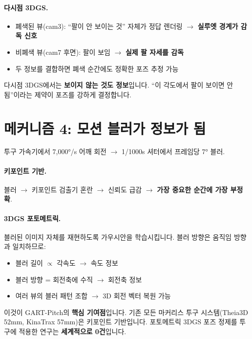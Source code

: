 \documentclass[11pt, a4paper]{report}
\begin{document}
\paragraph{다시점 3DGS.}
\begin{itemize}[leftmargin=*]
  \item 폐색된 뷰(cam3): ``팔이 안 보이는 것'' 자체가 정답 렌더링 $\to$ \textbf{실루엣 경계가 감독 신호}
  \item 비폐색 뷰(cam7 후면): 팔이 보임 $\to$ \textbf{실제 팔 자세를 감독}
  \item 두 정보를 결합하면 폐색 순간에도 정확한 포즈 추정 가능
\end{itemize}

\begin{keyidea}
다시점 3DGS에서는 \textbf{보이지 않는 것도 정보}입니다. ``이 각도에서 팔이 보이면 안 됨''이라는 제약이 포즈를 강하게 결정합니다.
\end{keyidea}


\section{메커니즘 4: 모션 블러가 정보가 됨}

투구 가속기에서 7,000°/s 어깨 회전 $\to$ 1/1000s 셔터에서 프레임당 7° 블러.

\paragraph{키포인트 기반.}
블러 $\to$ 키포인트 검출기 혼란 $\to$ 신뢰도 급감 $\to$ \textbf{가장 중요한 순간에 가장 부정확}.

\paragraph{3DGS 포토메트릭.}
블러된 이미지 자체를 재현하도록 가우시안을 학습시킵니다. 블러 방향은 움직임 방향과 일치하므로:
\begin{itemize}[leftmargin=*]
  \item 블러 길이 $\propto$ 각속도 $\to$ 속도 정보
  \item 블러 방향 = 회전축에 수직 $\to$ 회전축 정보
  \item 여러 뷰의 블러 패턴 조합 $\to$ 3D 회전 벡터 복원 가능
\end{itemize}

\begin{importantnote}
이것이 GART-Pitch의 \textbf{핵심 기여점}입니다. 기존 모든 마커리스 투구 시스템(Theia3D 52mm, KinaTrax 57mm)은 키포인트 기반입니다. 포토메트릭 3DGS 포즈 정제를 투구에 적용한 연구는 \textbf{세계적으로 0건}입니다.
\end{importantnote}
\end{document}
